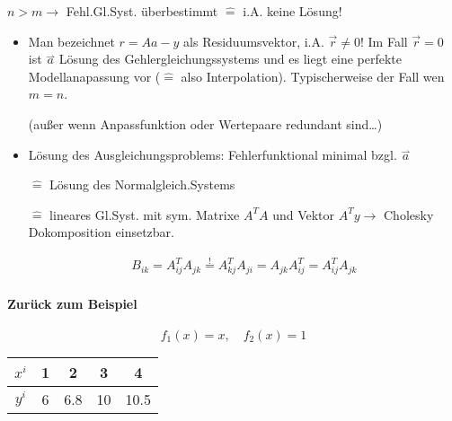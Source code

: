 \documentclass[a4paper,ngerman]{scrbook}
\newcommand{\rharp}[1]{\ensuremath{\overset{\rightharpoonup}{#1}}}%
\begin{document}
$n > m \to$ Fehl.Gl.Syst. überbestimmt $\hat{=}$ i.A\@. keine Lösung!
\begin{itemize}
\item Man bezeichnet $r = Aa-y$ als Residuumsvektor, i.A\@. $\vec{r} \neq 0$! Im Fall $\vec{r} = 0$ ist $\overset{\rightharpoonup}{a}$ Lösung des Gehlergleichungssystems und es liegt eine perfekte Modellanapassung vor ($\hat{=}$ also Interpolation). Typischerweise der Fall wen $m = n$.

(außer wenn Anpassfunktion oder Wertepaare redundant sind\dots)
\item Lösung des Ausgleichungsproblems: Fehlerfunktional minimal bzgl\@. $\rharp{a}$

$\hat{=}$ Lösung des Normalgleich.Systems

$\hat{=}$ lineares Gl.Syst. mit sym. Matrixe $A^TA$ und Vektor $A^Ty\to$ Cholesky Dokomposition einsetzbar.

\fbox{Lösungsvektor $\rharp{a}$}

\begin{align*}
  B_{ik} = A^T_{ij} A_{jk} \overset{!}{=} A^T_{kj} A_{ji} = A_{jk} A^T_{ij} = A^T_{ij} A_{jk}
\end{align*}
\end{itemize}

\paragraph{Zurück zum Beispiel}

\[
f_1(x) = x, \quad f_2(x) = 1
\]

\begin{tabular}{c|cccc}
  $x^i$ & 1 & 2 & 3 & 4\\\hline
  $y^i$ & 6 & 6.8 & 10 & 10.5
\end{tabular}
\end{document}
